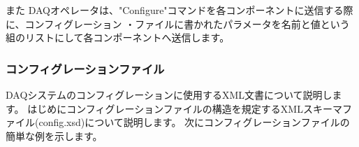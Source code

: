 \documentclass[a4j,10pt,dvips,onecolumn,oneside,final]{jarticle}%
\begin{document}
また DAQオペレータは、"Configure"コマンドを各コンポーネントに送信する際に、コンフィグレーション
・ファイルに書かれたパラメータを名前と値という組のリストにして各コンポーネントへ送信します。

\subsubsection{コンフィグレーションファイル}\label{config-file}
DAQシステムのコンフィグレーションに使用するXML文書について説明します。
はじめにコンフィグレーションファイルの構造を規定するXMLスキーマファイル(config.xsd)について説明します。
次にコンフィグレーションファイルの簡単な例を示します。
\end{document}
